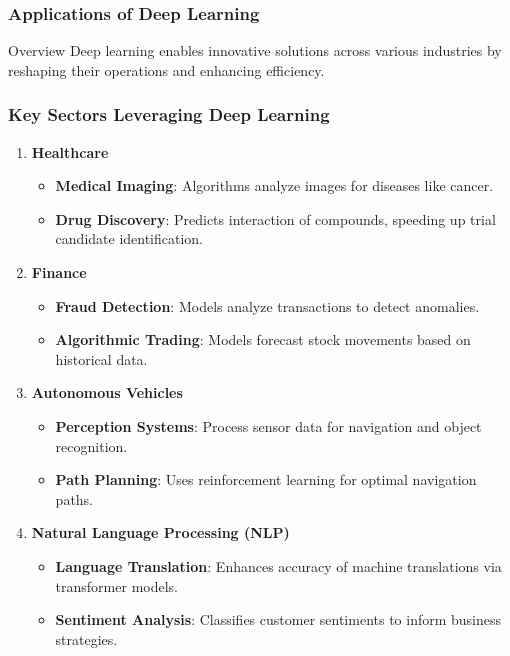 \documentclass{beamer}
\begin{document}
\begin{frame}[fragile]
    \frametitle{Applications of Deep Learning}
    \begin{block}{Overview}
        Deep learning enables innovative solutions across various industries by reshaping their operations and enhancing efficiency.
    \end{block}
\end{frame}

\begin{frame}[fragile]
    \frametitle{Key Sectors Leveraging Deep Learning}
    \begin{enumerate}
        \item \textbf{Healthcare}
            \begin{itemize}
                \item \textbf{Medical Imaging}: Algorithms analyze images for diseases like cancer.
                \item \textbf{Drug Discovery}: Predicts interaction of compounds, speeding up trial candidate identification.
            \end{itemize}
        \item \textbf{Finance}
            \begin{itemize}
                \item \textbf{Fraud Detection}: Models analyze transactions to detect anomalies.
                \item \textbf{Algorithmic Trading}: Models forecast stock movements based on historical data.
            \end{itemize}
        \item \textbf{Autonomous Vehicles}
            \begin{itemize}
                \item \textbf{Perception Systems}: Process sensor data for navigation and object recognition.
                \item \textbf{Path Planning}: Uses reinforcement learning for optimal navigation paths.
            \end{itemize}
        \item \textbf{Natural Language Processing (NLP)}
            \begin{itemize}
                \item \textbf{Language Translation}: Enhances accuracy of machine translations via transformer models.
                \item \textbf{Sentiment Analysis}: Classifies customer sentiments to inform business strategies.
            \end{itemize}
    \end{enumerate}
\end{frame}
\end{document}
